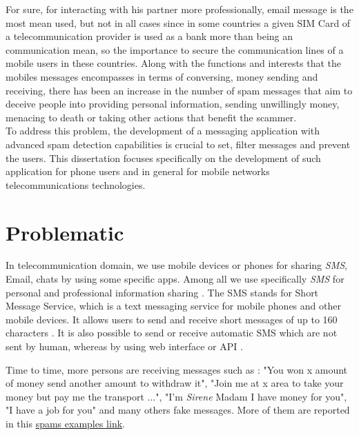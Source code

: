 \documentclass[12pt,a4paper]{report}
\begin{document}
	For sure, for interacting with his partner more professionally, email message is the most mean used, but not in all cases since in some countries a given SIM Card of a telecommunication provider is used as a bank more than being an communication mean, so the importance to secure the communication lines of a mobile users in these countries.
	Along with the functions and interests that the mobiles messages encompasses in terms of conversing, money sending and receiving, there has been an increase in the number of spam messages that aim to deceive people into providing personal information, sending unwillingly money, menacing to death or taking other actions that benefit the scammer.\\
		
	To address this problem, the development of a messaging application with advanced spam detection capabilities is crucial to set, filter messages and prevent the users. This dissertation focuses specifically on the development of such application for phone users and in general for mobile networks telecommunications technologies.  
	
	 
	\section{Problematic} 
	In telecommunication domain, we use mobile devices or phones for sharing \textit{SMS}, Email, chats by using some specific apps. Among all we use specifically \textit{SMS} for personal and professional information sharing \cite{lavanya2582sms}. The SMS stands for Short Message Service, which is a text messaging service for mobile phones and other mobile devices. It allows users to send and receive short messages of up to 160 characters \cite{le2005mobile}. It is also possible to send or receive automatic SMS which are not sent by human, whereas by using web interface or API \cite{jangir2016design}.
	
	Time to time, more persons are receiving messages such as : "You won x amount of money send another amount to withdraw it", "Join me at x area to take your money but pay me the transport ...", "I'm \textit{Sirene} Madam I have money for you", "I have a job for you" and many others fake messages. More of them are reported in this  \href{ https://blog.textedly.com/spam-text-message-examples}{spams examples link}.  
	
\end{document}

